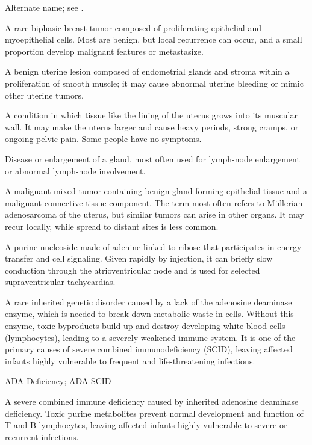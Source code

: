  Alternate name; see .

 A rare biphasic breast tumor
composed of proliferating epithelial and myoepithelial cells. Most are benign,
but local recurrence can occur, and a small proportion develop malignant
features or metastasize.

 A benign uterine lesion composed of endometrial glands and stroma within a proliferation of smooth muscle; it may cause abnormal uterine bleeding or mimic other uterine tumors.

 A condition in which tissue like the lining of the uterus grows into its muscular wall. It may make the uterus larger and cause heavy periods, strong cramps, or ongoing pelvic pain. Some people have no symptoms.

 Disease or enlargement of a gland, most often used for lymph-node enlargement or abnormal lymph-node involvement.

 A malignant mixed tumor containing benign gland-forming epithelial tissue and a malignant
connective-tissue component. The term most often refers to Müllerian adenosarcoma of the uterus,
but similar tumors can arise in other organs. It may recur locally, while spread to distant sites
is less common.

 A purine nucleoside made of adenine linked to ribose that participates in energy transfer and cell signaling. Given rapidly by injection, it can briefly slow conduction through the atrioventricular node and is used for selected supraventricular tachycardias.

 A rare inherited genetic disorder caused by a lack of the adenosine deaminase enzyme, which is needed to break down metabolic waste in cells. Without this enzyme, toxic byproducts build up and destroy developing white blood cells (lymphocytes), leading to a severely weakened immune system. It is one of the primary causes of severe combined immunodeficiency (SCID), leaving affected infants highly vulnerable to frequent and life-threatening infections.

\synonyms
ADA Deficiency; ADA-SCID

 A severe combined immune deficiency caused by inherited adenosine deaminase deficiency. Toxic purine metabolites prevent normal development and function of T and B lymphocytes, leaving affected infants highly vulnerable to severe or recurrent infections.

